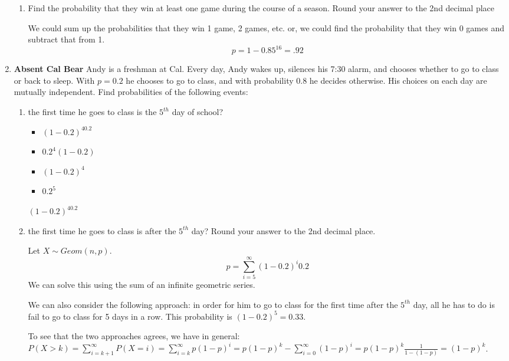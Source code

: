 \documentclass[11pt, preview]{standalone} %
\begin{document}
\begin{enumerate}
\begin{enumerate}
    \item Find the probability that they win at least one game during the course of a season. Round your answer to the 2nd decimal place
    \begin{Freeform}{0.92}
    \Solution We could sum up the probabilities that they win 1 game, 2 games, etc. or, we could find the probability that they win 0 games and subtract that from 1. \[p = 1 - 0.85^{16} = .92\]
    \end{Freeform}
\end{enumerate}
\item {\bf Absent Cal Bear} Andy is a freshman at Cal. Every day, Andy wakes up, silences his 7:30 alarm, and chooses whether to go to class or back to sleep. With $p = 0.2$ he chooses to go to class, and with probability $0.8$ he decides otherwise. His choices on each day are mutually independent. Find probabilities of the following events:
\begin{enumerate}
    \item the first time he goes to class is the $5^{th}$ day of school?
    \begin{Choices}
    \begin{itemize}
    	\TrueChoice\item $(1-0.2)^40.2$
    	\FalseChoice\item $0.2^4(1-0.2)$
    	\FalseChoice\item $(1-0.2)^4$
    	\FalseChoice\item $0.2^5$
    \end{itemize}
    \Solution $(1-0.2)^40.2$
    \end{Choices}

    \item the first time he goes to class is after the $5^{th}$ day? Round your answer to the 2nd decimal place.
    \begin{Freeform}{0.33}
    \Solution Let $X \sim Geom(n,p)$. \[ p = \sum_{i = 5}^{\infty} (1-0.2)^{i}0.2\] We can solve this using the sum of an infinite geometric series.

    We can also consider the following approach: in order for him to go to class for the first time after the $5^{th}$ day, all he has to do is fail to go to class for 5 days in a row. This probability is $(1-0.2)^5 = 0.33$. 

    To see that the two approaches agrees, we have in general: $P(X>k) = \sum_{i=k + 1}^{\infty} P(X=i) = \sum_{i=k}^{\infty} p(1-p)^i = p(1-p)^k - \sum_{i=0}^{\infty} (1-p)^i = p(1-p)^k \frac{1}{1-(1-p)} = (1-p)^k$.
    \end{Freeform}


\end{enumerate}
\end{enumerate}
\end{document}

